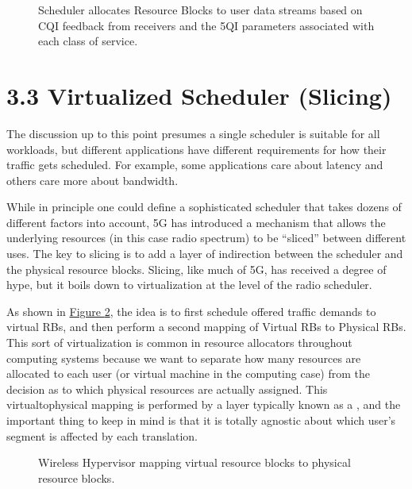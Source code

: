 \documentclass[a4paper,11pt,english]{sphinxmanual}
\let\sphinxpxdimen\pdfpxdimen\else\newdimen\sphinxpxdimen
\begin{document}
\begin{figure}[ht]
\centering
\capstart

\noindent\sphinxincludegraphics[width=600\sphinxpxdimen]{{Slide18}.png}
\caption{Scheduler allocates Resource Blocks to user data streams based on
CQI feedback from receivers and the 5QI parameters associated with
each class of service.}\label{\detokenize{radio:id9}}\label{\detokenize{radio:fig-scheduler}}\end{figure}


\section{3.3 Virtualized Scheduler (Slicing)}
\label{\detokenize{radio:virtualized-scheduler-slicing}}
\sphinxAtStartPar
The discussion up to this point presumes a single scheduler is
suitable for all workloads, but different applications have different
requirements for how their traffic gets scheduled. For example, some
applications care about latency and others care more about bandwidth.

\sphinxAtStartPar
While in principle one could define a sophisticated scheduler that
takes dozens of different factors into account, 5G has introduced a
mechanism that allows the underlying resources (in this case radio
spectrum) to be “sliced” between different uses. The key to slicing
is to add a layer of indirection between the scheduler and the
physical resource blocks. Slicing, like much of 5G, has received a
degree of hype, but it boils down to virtualization at the level of
the radio scheduler.

\sphinxAtStartPar
As shown in \hyperref[\detokenize{radio:fig-hypervisor}]{Figure \ref{\detokenize{radio:fig-hypervisor}}}, the idea is to first
schedule offered traffic demands to virtual RBs, and then
perform a second mapping of Virtual RBs to Physical RBs. This sort of
virtualization is common in resource allocators throughout computing
systems because we want to separate how many resources are allocated
to each user (or virtual machine in the computing case) from the
decision as to which physical resources are actually assigned. This
virtual\sphinxhyphen{}to\sphinxhyphen{}physical mapping is performed by a layer typically known as
a , and the important thing to keep in mind is that it is
totally agnostic about which user’s segment is affected by each
translation.

\begin{figure}[ht]
\centering
\capstart

\noindent\sphinxincludegraphics[width=600\sphinxpxdimen]{{Slide19}.png}
\caption{Wireless Hypervisor mapping virtual resource blocks to
physical resource blocks.}\label{\detokenize{radio:id10}}\label{\detokenize{radio:fig-hypervisor}}\end{figure}
\end{document}
